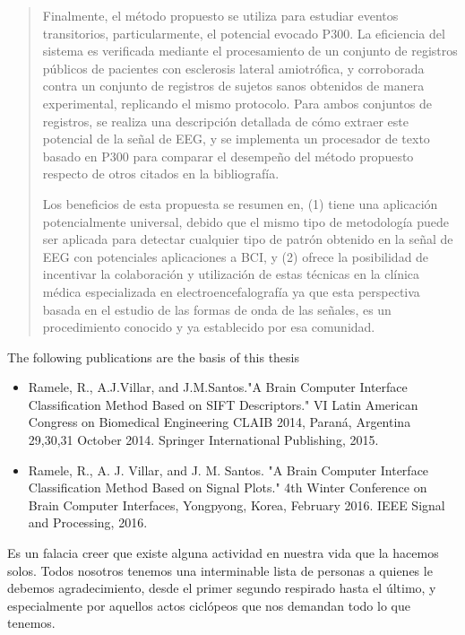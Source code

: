 \documentclass[11pt,twoside,openright]{moddalthesis}
\theoremstyle{definition}
\begin{document}
\begin{abstract}
Finalmente, el método propuesto se utiliza para estudiar eventos transitorios, particularmente, el potencial evocado P300.  La eficiencia del sistema es verificada mediante el procesamiento de un conjunto de registros públicos de pacientes con esclerosis lateral amiotrófica, y corroborada contra un conjunto de registros de sujetos sanos obtenidos de manera experimental, replicando el mismo protocolo. Para ambos conjuntos de registros, se realiza una descripción detallada de cómo extraer este potencial de la señal de EEG, y se implementa un procesador de texto basado en P300 para comparar el desempeño del método propuesto respecto de otros citados en la bibliografía.

Los beneficios de esta propuesta se resumen en, (1) tiene una aplicación potencialmente universal, debido  que el mismo tipo de metodología puede ser aplicada para detectar cualquier tipo de patrón obtenido en la señal de EEG con potenciales aplicaciones a BCI, y (2) ofrece la posibilidad de incentivar la colaboración y utilización de estas técnicas en la clínica médica especializada en electroencefalografía ya que esta perspectiva basada en el estudio de las formas de onda de las señales, es un procedimiento conocido y ya establecido por esa comunidad.

\end{abstract}


\begin{listofpubs}
The following publications are the basis of this thesis

\begin{itemize}
\item Ramele, R., A.J.Villar, and J.M.Santos."A Brain Computer Interface Classification Method Based on SIFT Descriptors." VI Latin American Congress on Biomedical Engineering CLAIB 2014, Paraná, Argentina 29,30,31 October 2014. Springer International Publishing, 2015.
\item Ramele, R., A. J. Villar, and J. M. Santos. "A Brain Computer Interface Classification Method Based on Signal Plots." 4th Winter Conference on Brain Computer Interfaces, Yongpyong, Korea, February 2016. IEEE Signal and Processing, 2016. 
\end{itemize}
\end{listofpubs}


\begin{acknowledgements}
Es un falacia creer que existe alguna actividad en nuestra vida que la hacemos solos.  Todos nosotros tenemos una interminable lista de personas a quienes le debemos agradecimiento, desde el primer segundo respirado hasta el último, y especialmente por aquellos actos ciclópeos que nos demandan todo lo que tenemos.
\end{acknowledgements}
\end{document}
